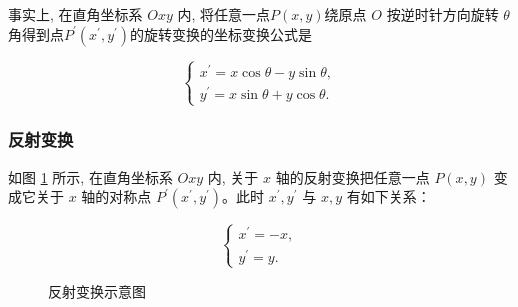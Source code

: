 \documentclass[lang=cn,newtx,10pt,scheme=chinese]{elegantbook}
\begin{document}
事实上, 在直角坐标系 $O x y$ 内, 将任意一点$P(x, y)$绕原点 $O$ 按逆时针方向旋转 $\theta$ 角得到点$P^{\prime}(x^{\prime}, y^{\prime})$的旋转变换的坐标变换公式是

\begin{equation}
\left\{\begin{array}{l}
x^{\prime}=x \cos \theta-y \sin \theta, \\
y^{\prime}=x \sin \theta+y \cos \theta .
\end{array}\right.\label{eq:旋转变换的坐标变换公式}
\end{equation}

\subsubsection{反射变换}
\label{subsubsec:反射变换}

如图 \ref{fig:反射变换} 所示, 在直角坐标系 $O x y$ 内, 关于 $x$ 轴的反射变换把任意一点 $P(x, y)$ 变成它关于 $x$ 轴的对称点 $P^{\prime}\left(x^{\prime}, y^{\prime}\right)$。此时 $x^{\prime}, y^{\prime}$ 与 $x, y$ 有如下关系：

\begin{equation}
\left\{\begin{array}{l}
x^{\prime}=-x, \\
y^{\prime}=y .
\end{array}\right.
\label{eq:反射变换的表达式}
\end{equation}

\begin{figure}[h]
\centering
{}
\caption{反射变换示意图\label{fig:反射变换}}
\end{figure}
\end{document}

